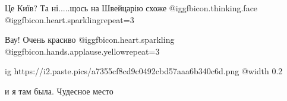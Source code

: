  
 
 
 
 


Це Київ?
Та ні.....щось на Швейцарію схоже  @igg{fbicon.thinking.face}  @igg{fbicon.heart.sparkling}{repeat=3} 

Вау! Очень красиво  @igg{fbicon.heart.sparkling}  @igg{fbicon.hands.applause.yellow}{repeat=3} 

\ifcmt
  ig https://i2.paste.pics/a7355cf8cd9c0492cbd57aaa6b340c6d.png
  @width 0.2
\fi

и я там была. Чудесное место
